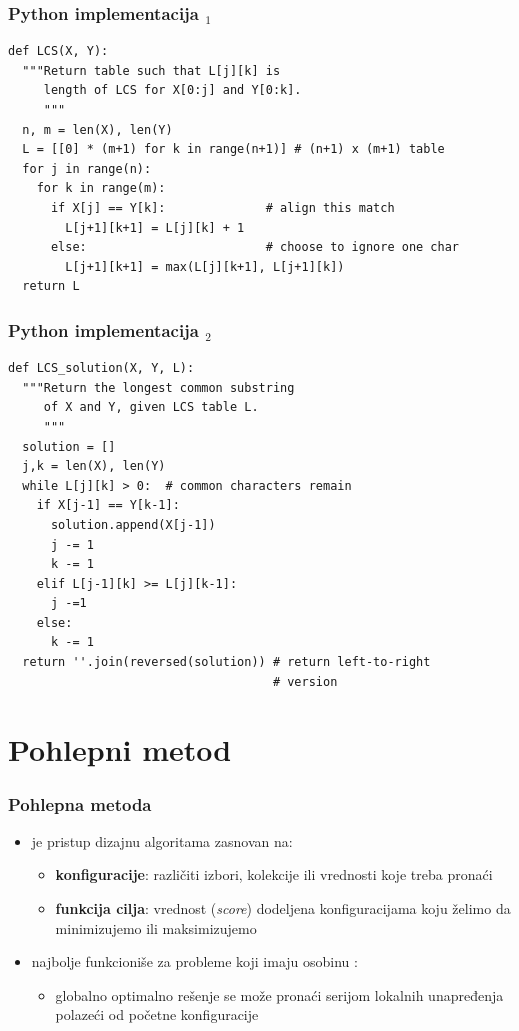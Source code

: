 \documentclass[compress]{beamer}
\begin{document}
\begin{frame}[fragile,shrink=10]
  \frametitle{Python implementacija $_1$}
\begin{verbatim}
def LCS(X, Y):
  """Return table such that L[j][k] is 
     length of LCS for X[0:j] and Y[0:k].
     """
  n, m = len(X), len(Y)                
  L = [[0] * (m+1) for k in range(n+1)] # (n+1) x (m+1) table
  for j in range(n):
    for k in range(m):
      if X[j] == Y[k]:              # align this match
        L[j+1][k+1] = L[j][k] + 1            
      else:                         # choose to ignore one char
        L[j+1][k+1] = max(L[j][k+1], L[j+1][k])
  return L
\end{verbatim}
\end{frame}

\begin{frame}[fragile,shrink=10]
  \frametitle{Python implementacija $_2$}
\begin{verbatim}
def LCS_solution(X, Y, L):
  """Return the longest common substring 
     of X and Y, given LCS table L.
     """
  solution = []
  j,k = len(X), len(Y)
  while L[j][k] > 0:  # common characters remain
    if X[j-1] == Y[k-1]:
      solution.append(X[j-1])
      j -= 1
      k -= 1
    elif L[j-1][k] >= L[j][k-1]:
      j -=1
    else:
      k -= 1
  return ''.join(reversed(solution)) # return left-to-right 
                                     # version
\end{verbatim}
\end{frame}

\section[Pohlepa]{Pohlepni metod}

\begin{frame}[fragile]
  \frametitle{Pohlepna metoda}
  \begin{itemize}
    \item {} je pristup dizajnu algoritama zasnovan
    na:
    \begin{itemize}
      \item \textbf{konfiguracije}: različiti izbori, kolekcije ili 
      vrednosti koje treba pronaći
      \item \textbf{funkcija cilja}: vrednost (\textit{score}) dodeljena
      konfiguracijama koju želimo da minimizujemo ili maksimizujemo
    \end{itemize}
    \item najbolje funkcioniše za probleme koji imaju osobinu 
    :
    \begin{itemize}
      \item globalno optimalno rešenje se može pronaći serijom lokalnih 
      unapređenja polazeći od početne konfiguracije
    \end{itemize}
  \end{itemize}
\end{frame}
\end{document}
